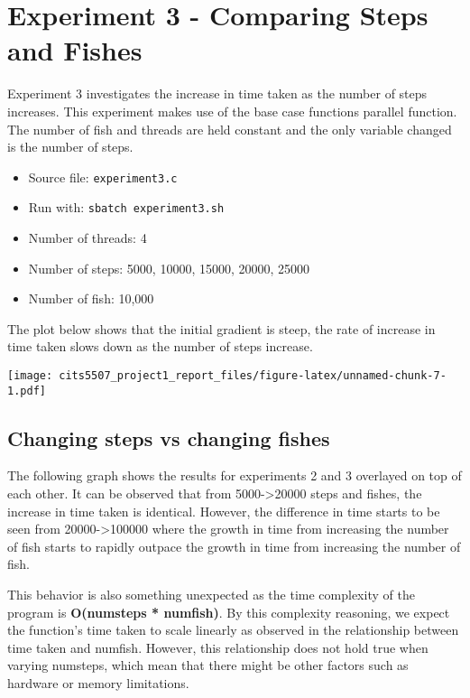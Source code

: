 \documentclass[
]{article}
\providecommand{\tightlist}{%
  \setlength{\itemsep}{0pt}\setlength{\parskip}{0pt}}
\begin{document}
\hypertarget{experiment-3---comparing-steps-and-fishes}{%
\section{Experiment 3 - Comparing Steps and
Fishes}\label{experiment-3---comparing-steps-and-fishes}}

Experiment 3 investigates the increase in time taken as the number of
steps increases. This experiment makes use of the base case functions
parallel function. The number of fish and threads are held constant and
the only variable changed is the number of steps.

\begin{itemize}
\tightlist
\item
  Source file: \texttt{experiment3.c}
\item
  Run with: \texttt{sbatch\ experiment3.sh}
\item
  Number of threads: 4
\item
  Number of steps: 5000, 10000, 15000, 20000, 25000
\item
  Number of fish: 10,000
\end{itemize}

The plot below shows that the initial gradient is steep, the rate of
increase in time taken slows down as the number of steps increase.

\texttt{[image: cits5507\_project1\_report\_files/figure-latex/unnamed-chunk-7-1.pdf]}

\hypertarget{changing-steps-vs-changing-fishes}{%
\subsection{Changing steps vs changing
fishes}\label{changing-steps-vs-changing-fishes}}

The following graph shows the results for experiments 2 and 3 overlayed
on top of each other. It can be observed that from
5000-\textgreater20000 steps and fishes, the increase in time taken is
identical. However, the difference in time starts to be seen from
20000-\textgreater100000 where the growth in time from increasing the
number of fish starts to rapidly outpace the growth in time from
increasing the number of fish.

This behavior is also something unexpected as the time complexity of the
program is \textbf{O(numsteps * numfish)}. By this complexity reasoning,
we expect the function's time taken to scale linearly as observed in the
relationship between time taken and numfish. However, this relationship
does not hold true when varying numsteps, which mean that there might be
other factors such as hardware or memory limitations.
\end{document}
